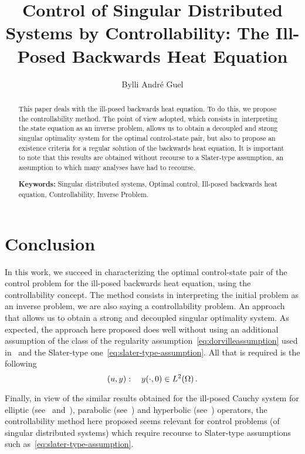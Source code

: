 \documentclass[a4paper,12pt]{article}
\title{Control of Singular Distributed Systems by Controllability: The
Ill-Posed Backwards Heat Equation}
\author{Bylli André Guel}
\begin{document}

\parindent=0pt{}
\parskip=6pt{}

\maketitle{}

\begin{abstract}
    This paper deals with the ill-posed backwards heat equation. To do
    this, we propose the controllability method. The point of view adopted,
    which consists in interpreting the state equation as an inverse problem,
    allows us to obtain a decoupled and strong singular optimality system
    for the optimal control-state pair, but also to propose an existence
    criteria for a regular solution of the backwards heat equation. It is
    important to note that this results are obtained without recourse to a
    Slater-type assumption, an assumption to which many analyses have had
    to recourse.

    \vspace{\baselineskip}
    \textbf{Keywords:} Singular distributed systems, Optimal control,
    Ill-posed backwards heat equation, Controllability, Inverse Problem.
\end{abstract}





\section{Conclusion}

In this work, we succeed in characterizing the optimal control-state pair
of the control problem for the ill-posed backwards heat equation, using the
controllability concept. The method consists in interpreting the initial
problem as an inverse problem, we are also saying a controllability
problem. An approach that allows us to obtain a strong and decoupled
singular optimality system. As expected, the approach here proposed does
well without using an additional assumption of the class of the regularity
assumption~\eqref{eq:dorvilleassumption} used in~\cite{dorville} and the
Slater-type one~\eqref{eq:slater-type-assumption}. All that is required is
the following
\begin{equation}
    (u,y):\quad {y}\!\left({\cdot, 0}\right)\in L^{2}\!\left({\Omega}\right).
\end{equation}

Finally, in view of the similar results obtained for the ill-posed Cauchy
system for elliptic (see~\cite{ownElliptic} and~\cite{ownAAA}), parabolic
(see~\cite{ownParabolic}) and hyperbolic (see~\cite{ownhyperbolic})
operators,
the controllability method here proposed seems
relevant for control problems (of singular distributed systems) which
require recourse to Slater-type assumptions such
as~\eqref{eq:slater-type-assumption}.

\nocite{*}
\printbibliography{}
\end{document}
